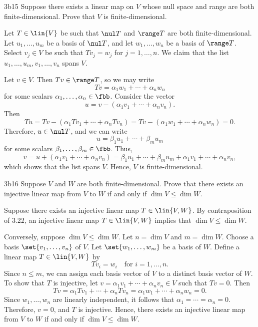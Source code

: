 \begin{exercise}{3b15}
    Suppose there exists a linear map on $V$ whose null space and range are both finite-dimensional.
	Prove that $V$ is finite-dimensional.

\end{exercise}

\begin{sol}
    Let $T \in \lin{V}$ be such that $\nul T$ and $\range T$ are both finite-dimensional.
	Let $u_1, \ldots, u_m$ be a basis of $\nul T$, and let $w_1, \ldots, w_n$ be a basis of $\range T$.
	Select $v_j \in V$ be such that $Tv_j = w_j$ for $j = 1, \ldots, n$.
	We claim that the list $u_1, \ldots, u_m, v_1, \ldots, v_n$ spans $V$.
    
    Let $v \in V$.
	Then $Tv \in \range T$, so we may write
    \[
    	Tv = \alpha_1 w_1 + \cdots + \alpha_n w_n
    \]
    for some scalars $\alpha_1, \ldots, \alpha_n \in \fbb$.
	Consider the vector
    \[
    	u = v - (\alpha_1 v_1 + \cdots + \alpha_n v_n).
    \]
    Then
    \[
    	Tu = Tv - (\alpha_1 Tv_1 + \cdots + \alpha_n Tv_n) = Tv - (\alpha_1 w_1 + \cdots + \alpha_n w_n) = 0.
    \]
    Therefore, $u \in \nul T$, and we can write
    \[
    	u = \beta_1 u_1 + \cdots + \beta_m u_m
    \]
    for some scalars $\beta_1, \ldots, \beta_m \in \fbb$.
	Thus,
    \[
    	v = u + (\alpha_1 v_1 + \cdots + \alpha_n v_n) = \beta_1 u_1 + \cdots + \beta_m u_m + \alpha_1 v_1 + \cdots + \alpha_n v_n,
    \]
    which shows that the list spans $V$.
	Hence, $V$ is finite-dimensional.
\end{sol}

\begin{exercise}{3b16}
    Suppose $V$ and $W$ are both finite-dimensional.
	Prove that there exists an injective linear map from $V$ to $W$ if and only if $\dim V \leq \dim W$.
\end{exercise}

\begin{sol}
    Suppose there exists an injective linear map $T \in \lin{V, W}$.
	By contraposition of 3.22, an injective linear map $T \in \lin{V, W}$ implies that $\dim V \leq \dim W$.

    Conversely, suppose $\dim V \leq \dim W$.
	Let $n = \dim V$ and $m = \dim W$.
	Choose a basis $\set{v_1, \ldots, v_n}$ of $V$.
	Let $\set{w_1, \ldots, w_m}$ be a basis of $W$.
	Define a linear map $T \in \lin{V, W}$ by
    \[
    	Tv_i = w_i \quad \text{for } i = 1, \ldots, n.
    \]
    Since $n \leq m$, we can assign each basis vector of $V$ to a distinct basis vector of $W$.
	To show that $T$ is injective, let $v = \alpha_1 v_1 + \cdots + \alpha_n v_n \in V$ such that $Tv = 0$.
	Then
    \[
    	Tv = \alpha_1 Tv_1 + \cdots + \alpha_n Tv_n = \alpha_1 w_1 + \cdots + \alpha_n w_n = 0.
    \]
    Since $w_1, \ldots, w_n$ are linearly independent, it follows that $\alpha_1 = \cdots = \alpha_n = 0$.
	Therefore, $v = 0$, and $T$ is injective.
	Hence, there exists an injective linear map from $V$ to $W$ if and only if $\dim V \leq \dim W$.
\end{sol}

